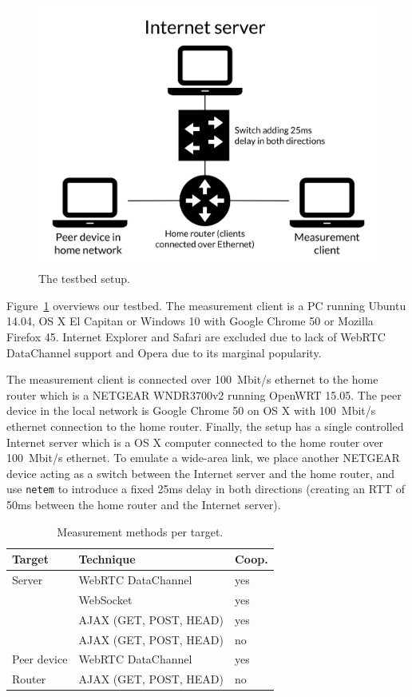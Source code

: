 \documentclass{sig-alternate-10pt}
\begin{document}
\begin{figure}[tbh]
\begin{center}
\includegraphics[width=0.65\columnwidth]{figures/setup}
\end{center}
\caption{The testbed setup.}\label{fig:setup}
\end{figure}

Figure~\ref{fig:setup} overviews our testbed. 
The measurement client is a PC running Ubuntu 14.04, OS X El Capitan or Windows 10 with Google Chrome 50 or Mozilla Firefox 45. 
Internet Explorer and Safari are excluded due to lack of WebRTC DataChannel support and Opera due to its marginal popularity. 

The measurement client is connected over 100~Mbit/s ethernet to the home router which is a NETGEAR WNDR3700v2 running OpenWRT 15.05. The peer device in the local network is Google Chrome 50 on OS X with 100~Mbit/s ethernet connection to the home router. Finally, the setup has a single controlled Internet server which is a OS X computer connected to the home router over 100~Mbit/s ethernet. To emulate a wide-area link, we place another NETGEAR device acting as a switch between the Internet server and the home router, and use \texttt{netem} to introduce a fixed 25ms delay in both directions (creating an RTT of 50ms between the home router and the Internet server).

\begin{table}[tbh]
\centering
\begin{small}
\begin{tabular}{l l l}
\toprule
\textbf{Target} & \textbf{Technique} & \textbf{Coop.} \\
\midrule
Server & WebRTC DataChannel & yes \\
            & WebSocket & yes  \\
	    & AJAX (GET, POST, HEAD) & yes \\
	    & AJAX (GET, POST, HEAD) & no \\
\midrule
Peer device & WebRTC DataChannel & yes \\
\midrule
Router & AJAX (GET, POST, HEAD) & no \\
\bottomrule
\end{tabular}
\end{small}
\caption {Measurement methods per target.} 
\label{tab:targets}
\end{table}
\end{document}
